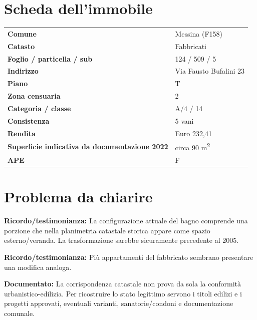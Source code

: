 \documentclass[11pt,a4paper]{article}
\newcommand{\docu}[1]{\textbf{\color{ok}Documentato:} #1}
\newcommand{\memo}[1]{\textbf{\color{accent}Ricordo/testimonianza:} #1}
\begin{document}
\section{Scheda dell'immobile}
\begin{tabularx}{\textwidth}{>{\bfseries}p{4.5cm}X}\toprule
Comune & Messina (F158)\\
Catasto & Fabbricati\\
Foglio / particella / sub & 124 / 509 / 5\\
Indirizzo & Via Fausto Bufalini 23\\
Piano & T\\
Zona censuaria & 2\\
Categoria / classe & A/4 / 14\\
Consistenza & 5 vani\\
Rendita & Euro 232,41\\
Superficie indicativa da documentazione 2022 & circa 90 m\textsuperscript{2}\\
APE & F\\ \bottomrule
\end{tabularx}

\section{Problema da chiarire}
\memo{La configurazione attuale del bagno comprende una porzione che nella planimetria catastale storica appare come spazio esterno/veranda. La trasformazione sarebbe sicuramente precedente al 2005.}

\memo{Più appartamenti del fabbricato sembrano presentare una modifica analoga.}

\docu{La corrispondenza catastale non prova da sola la conformità urbanistico-edilizia. Per ricostruire lo stato legittimo servono i titoli edilizi e i progetti approvati, eventuali varianti, sanatorie/condoni e documentazione comunale.}
\end{document}
